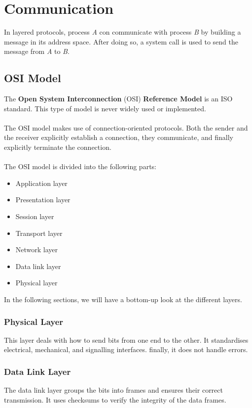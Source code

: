 \documentclass{article}
\begin{document}
\section{Communication}
In layered protocols, process \textit{A} con communicate with process \textit{B} by building a message in its address space. After doing so, a system call is used to send the message from \textit{A} to \textit{B}.

\subsection{OSI Model}
The \textbf{Open System Interconnection} (OSI) \textbf{Reference Model} is an ISO standard. This type of model is never widely used or implemented. \\ \\
The OSI model makes use of connection-oriented protocols. Both the sender and the receiver explicitly establish a connection, they communicate, and finally explicitly terminate the connection. \\ \\
The OSI model is divided into the following parts:

\begin{itemize}
	\item Application layer
	\item Presentation layer
	\item Session layer
	\item Transport layer
	\item Network layer
	\item Data link layer
	\item Physical layer
\end{itemize}

\noindent In the following sections, we will have a bottom-up look at the different layers.

\subsubsection{Physical Layer}
This layer deals with how to send bits from one end to the other. It standardises electrical, mechanical, and signalling interfaces. finally, it does not handle errors.

\subsubsection{Data Link Layer}
The data link layer groups the bits into frames and ensures their correct transmission. It uses checksums to verify the integrity of the data frames.
\end{document}
